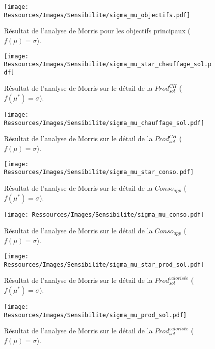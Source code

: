 
\begin{landscape}

\begin{figure}
    \centering
    \texttt{[image: Ressources/Images/Sensibilite/sigma\_mu\_objectifs.pdf]}
    \caption{Résultat de l’analyse de Morris pour les objectifs principaux
             ($f(\mu) = \sigma$).
             \label{fig:objectifs_mu}}
\end{figure}

\begin{figure}
    \centering
    \texttt{[image: Ressources/Images/Sensibilite/sigma\_mu\_star\_chauffage\_sol.pdf]}
    \caption{Résultat de l’analyse de Morris sur le détail de la
             $Prod_{sol}^{CH}$ ($f(\mu^{*}) = \sigma$).
             \label{fig:prod_sol_chauffage_mu_star}}
\end{figure}

\begin{figure}
    \centering
    \texttt{[image: Ressources/Images/Sensibilite/sigma\_mu\_chauffage\_sol.pdf]}
    \caption{Résultat de l’analyse de Morris sur le détail de la
             $Prod_{sol}^{CH}$ ($f(\mu) = \sigma$).
             \label{fig:prod_sol_chauffage_mu}}
\end{figure}


\begin{figure}
    \centering
    \texttt{[image: Ressources/Images/Sensibilite/sigma\_mu\_star\_conso.pdf]}
    \caption{Résultat de l’analyse de Morris sur le détail de la
             $Conso_{app}$ ($f(\mu^{*}) = \sigma$).
             \label{fig:conso_app_mu_star}}
\end{figure}

\begin{figure}
    \centering
    \texttt{[image: Ressources/Images/Sensibilite/sigma\_mu\_conso.pdf]}
    \caption{Résultat de l’analyse de Morris sur le détail de la
             $Conso_{app}$ ($f(\mu) = \sigma$).
             \label{fig:conso_app_mu}}
\end{figure}

\begin{figure}
    \centering
    \texttt{[image: Ressources/Images/Sensibilite/sigma\_mu\_star\_prod\_sol.pdf]}
    \caption{Résultat de l’analyse de Morris sur le détail de la
             $Prod_{sol}^{valorisée}$ ($f(\mu^{*}) = \sigma$).
             \label{fig:prod_sol_valorisee_mu_star}}
\end{figure}

\begin{figure}
    \centering
    \texttt{[image: Ressources/Images/Sensibilite/sigma\_mu\_prod\_sol.pdf]}
    \caption{Résultat de l’analyse de Morris sur le détail de la
             $Prod_{sol}^{valorisée}$ ($f(\mu) = \sigma$).
             \label{fig:prod_sol_valorisee_mu}}
\end{figure}

\end{landscape}
